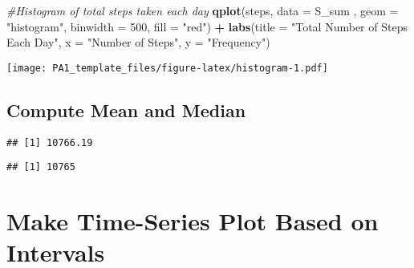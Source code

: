 \documentclass[]{article}
\newenvironment{Shaded}{\begin{snugshade}}{\end{snugshade}}
\newcommand{\KeywordTok}[1]{\textcolor[rgb]{0.13,0.29,0.53}{\textbf{#1}}}
\newcommand{\DataTypeTok}[1]{\textcolor[rgb]{0.13,0.29,0.53}{#1}}
\newcommand{\DecValTok}[1]{\textcolor[rgb]{0.00,0.00,0.81}{#1}}
\newcommand{\StringTok}[1]{\textcolor[rgb]{0.31,0.60,0.02}{#1}}
\newcommand{\CommentTok}[1]{\textcolor[rgb]{0.56,0.35,0.01}{\textit{#1}}}
\newcommand{\OperatorTok}[1]{\textcolor[rgb]{0.81,0.36,0.00}{\textbf{#1}}}
\newcommand{\NormalTok}[1]{#1}
\begin{document}
\begin{Shaded}
\begin{Highlighting}[]
\CommentTok{#Histogram of total steps taken each day}
\KeywordTok{qplot}\NormalTok{(steps, }\DataTypeTok{data =}\NormalTok{ S_sum , }\DataTypeTok{geom =} \StringTok{"histogram"}\NormalTok{, }\DataTypeTok{binwidth =} \DecValTok{500}\NormalTok{, }\DataTypeTok{fill =} \StringTok{"red"}\NormalTok{) }\OperatorTok{+}\StringTok{ }
\StringTok{    }\KeywordTok{labs}\NormalTok{(}\DataTypeTok{title =} \StringTok{"Total Number of Steps Each Day"}\NormalTok{, }\DataTypeTok{x =} \StringTok{"Number of Steps"}\NormalTok{, }\DataTypeTok{y =} \StringTok{"Frequency"}\NormalTok{)}
\end{Highlighting}
\end{Shaded}

\texttt{[image: PA1\_template\_files/figure-latex/histogram-1.pdf]}

\subsection{Compute Mean and Median}\label{compute-mean-and-median}

\begin{Shaded}
\end{Shaded}

\begin{verbatim}
## [1] 10766.19
\end{verbatim}

\begin{Shaded}
\end{Shaded}

\begin{verbatim}
## [1] 10765
\end{verbatim}

\section{Make Time-Series Plot Based on
Intervals}\label{make-time-series-plot-based-on-intervals}
\end{document}
